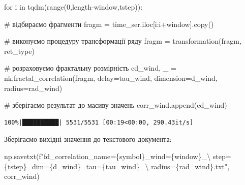 \documentclass[
  letterpaper,
]{report}
\newenvironment{Shaded}{\begin{snugshade}}{\end{snugshade}}
\newcommand{\BuiltInTok}[1]{\textcolor[rgb]{0.00,0.23,0.31}{#1}}
\newcommand{\CharTok}[1]{\textcolor[rgb]{0.13,0.47,0.30}{#1}}
\newcommand{\CommentTok}[1]{\textcolor[rgb]{0.37,0.37,0.37}{#1}}
\newcommand{\ControlFlowTok}[1]{\textcolor[rgb]{0.00,0.23,0.31}{#1}}
\newcommand{\DecValTok}[1]{\textcolor[rgb]{0.68,0.00,0.00}{#1}}
\newcommand{\KeywordTok}[1]{\textcolor[rgb]{0.00,0.23,0.31}{#1}}
\newcommand{\NormalTok}[1]{\textcolor[rgb]{0.00,0.23,0.31}{#1}}
\newcommand{\OperatorTok}[1]{\textcolor[rgb]{0.37,0.37,0.37}{#1}}
\newcommand{\SpecialCharTok}[1]{\textcolor[rgb]{0.37,0.37,0.37}{#1}}
\newcommand{\SpecialStringTok}[1]{\textcolor[rgb]{0.13,0.47,0.30}{#1}}
\begin{document}
\begin{Shaded}
\begin{Highlighting}[]
\ControlFlowTok{for}\NormalTok{ i }\KeywordTok{in}\NormalTok{ tqdm(}\BuiltInTok{range}\NormalTok{(}\DecValTok{0}\NormalTok{,length}\OperatorTok{{-}}\NormalTok{window,tstep)):}
    
    \CommentTok{\# відбираємо фрагменти}
\NormalTok{    fragm }\OperatorTok{=}\NormalTok{ time\_ser.iloc[i:i}\OperatorTok{+}\NormalTok{window].copy()  }

    \CommentTok{\# виконуємо процедуру трансформації ряду }
\NormalTok{    fragm }\OperatorTok{=}\NormalTok{ transformation(fragm, ret\_type)}

    \CommentTok{\# розраховуємо фрактальну розмірність }
\NormalTok{    cd\_wind, \_ }\OperatorTok{=}\NormalTok{ nk.fractal\_correlation(fragm,}
\NormalTok{                                        delay}\OperatorTok{=}\NormalTok{tau\_wind, }
\NormalTok{                                        dimension}\OperatorTok{=}\NormalTok{d\_wind,}
\NormalTok{                                        radius}\OperatorTok{=}\NormalTok{rad\_wind)}

    \CommentTok{\# зберігаємо результат до масиву значень}
\NormalTok{    corr\_wind.append(cd\_wind)}
\end{Highlighting}
\end{Shaded}

\begin{verbatim}
100%|██████████| 5531/5531 [00:19<00:00, 290.43it/s]
\end{verbatim}

Зберігаємо вихідні значення до текстового документа:

\begin{Shaded}
\begin{Highlighting}[]
\NormalTok{np.savetxt(}\SpecialStringTok{f"fd\_correlation\_name=}\SpecialCharTok{\{}\NormalTok{symbol}\SpecialCharTok{\}}\SpecialStringTok{\_wind=}\SpecialCharTok{\{}\NormalTok{window}\SpecialCharTok{\}}\SpecialStringTok{\_}\CharTok{\textbackslash{}}
\SpecialStringTok{                step=}\SpecialCharTok{\{}\NormalTok{tstep}\SpecialCharTok{\}}\SpecialStringTok{\_dim=}\SpecialCharTok{\{}\NormalTok{d\_wind}\SpecialCharTok{\}}\SpecialStringTok{\_tau=}\SpecialCharTok{\{}\NormalTok{tau\_wind}\SpecialCharTok{\}}\SpecialStringTok{\_}\CharTok{\textbackslash{}}
\SpecialStringTok{                radius=}\SpecialCharTok{\{}\NormalTok{rad\_wind}\SpecialCharTok{\}}\SpecialStringTok{.txt"}\NormalTok{, corr\_wind)}
\end{Highlighting}
\end{Shaded}
\end{document}
